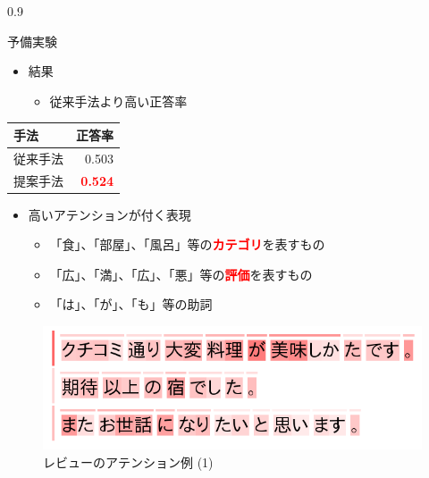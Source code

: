 \documentclass[unicode,10pt]{beamer}
\newlength{\mycolumnwidth}
\newcommand{\itemtitle}[1]{#1\\}
\newcommand{\fire}[1]{\textcolor{red}{\textbf{#1}}}
\begin{document}
\begin{frame}[t]
\begin{columns}[onlytextwidth,t]
\begin{column}{0.9\mycolumnwidth}
\begin{block}{予備実験}
      \begin{minipage}[t]{0.55\linewidth}
        \begin{itemize}
          \item \itemtitle{結果}
            \begin{itemize}
              \item 従来手法より高い正答率
            \end{itemize}
        \end{itemize}
      \end{minipage}%
      \begin{minipage}[t]{0.4\linewidth}
        \begin{table}
          \centering
          \begin{tabular}{l | r}
            手法 & 正答率 \\
            \hline
            従来手法\cite{me16} & 0.503        \\
            提案手法            & \fire{0.524} \\
          \end{tabular}
        \end{table}
      \end{minipage}

      \begin{itemize}
        \item 高いアテンションが付く表現
          \begin{itemize}
            \item 「食」、「部屋」、「風呂」等の\fire{カテゴリ}を表すもの
            \item 「広」、「満」、「広」、「悪」等の\fire{評価}を表すもの
            \item 「は」、「が」、「も」等の助詞
          \end{itemize}
      \end{itemize}

      \begin{figure}
        \centering
        \includegraphics[width=0.9\linewidth]{fig/review_1.png}
        \caption*{レビューのアテンション例 (1)}
      \end{figure}


\end{block}
\end{column}
\end{columns}
\end{frame}
\end{document}
